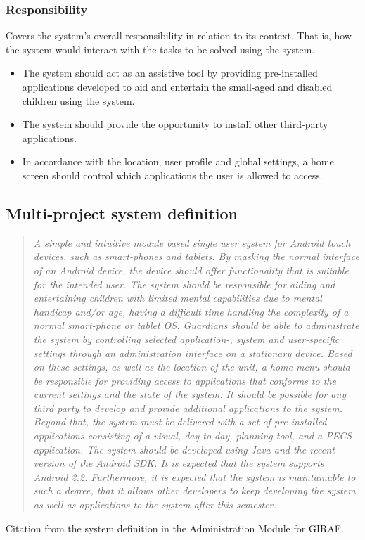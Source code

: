 \subsubsection*{Responsibility} 
Covers the system's overall responsibility in relation to its context. That is, how the system would interact with the tasks to be solved using the system.
\begin{itemize}
	\item The system should act as an assistive tool by providing pre-installed applications developed to aid and entertain the small-aged and disabled children using the system. 
	\item The system should provide the opportunity to install other third-party applications. 
	\item In accordance with the location, user profile and global settings, a home screen should control which applications the user is allowed to access.
\end{itemize}

\subsection{Multi-project system definition}

\begin{quotation}
\emph{A simple and intuitive module based single user system for Android touch devices, such as smart-phones and tablets. By masking the normal interface of an Android device, the device should offer functionality that is suitable for the intended user.
The system should be responsible for aiding and entertaining children with limited mental capabilities due to mental handicap and/or age, having a difficult time handling the complexity of a normal smart-phone or tablet OS. Guardians should be able to administrate the system by controlling selected application-, system and user-specific settings through an administration interface on a stationary device. Based on these settings, as well as the location of the unit, a home menu should be responsible for providing access to applications that conforms to the current settings and the state of the system. It should be possible for any third party to develop and provide additional applications to the system. Beyond that, the system must be delivered with a set of pre-installed applications consisting of a visual, day-to-day, planning tool, and a PECS application. The system should be developed using Java and the recent version of the Android SDK. It is expected that the system supports Android 2.2. Furthermore, it is expected that the system is maintainable to such a degree, that it allows other developers to keep developing the system as well as applications to the system after this semester.}
\end{quotation}
Citation from the system definition in the Administration Module for GIRAF.\cite{giraffactors}

